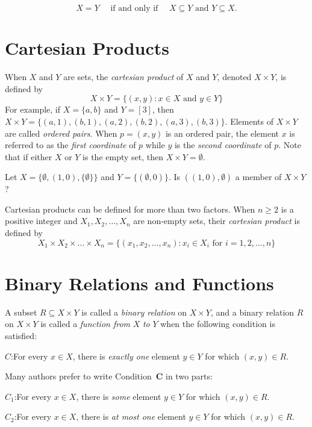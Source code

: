 \[
X = Y \quad\text{ if and only if }\quad X\subseteq Y \text{ and } Y\subseteq X.
\]  

\section{Cartesian Products} 

When $X$ and $Y$ are sets, the \textit{cartesian product}
of $X$ and $Y$, denoted $X\times Y$, is defined by
\[
X\times Y=\{(x,y): x\in X \text{ and } y\in Y\}
\]
For example, if $X=\{a,b\}$ and $Y=[3]$, then
$X\times Y=\{(a,1),(b,1),(a,2),(b,2),(a,3),(b,3)\}$.
Elements of $X\times Y$ are called \textit{ordered pairs}.
When $p=(x,y)$ is an ordered pair, the element $x$ is referred
to as the \textit{first coordinate} of $p$ while $y$ is the
\textit{second coordinate} of $p$.
Note that if either $X$ or $Y$ is the empty set, then
$X\times Y=\emptyset$.

\begin{example}
Let $X=\{\emptyset,(1,0),\{\emptyset\}\}$ and $Y=\{(\emptyset,0)\}$.
Is $((1,0),\emptyset)$ a member of $X\times Y$?
\end{example}

Cartesian products can be defined for more than two factors.
When $n\ge 2$ is a positive integer and $X_1,X_2,\dots,X_n$ are
non-empty sets, their \textit{cartesian product} is defined
by
\[
X_1\times X_2\times\dots\times X_n=\{(x_1,x_2,\dots,x_n): x_i\in X_i
\text{ for } i = 1,2,\dots,n\}
\]


\section{Binary Relations and Functions}

A subset $R\subseteq X\times Y$ is called a \textit{binary
relation} on $X\times Y$, and a binary relation $R$ on $X\times Y$ 
is called a \textit{function from} $X$ \textit{to} $Y$ when the
following condition is satisfied:

\medskip
\noindent
$C$:\quad For every $x\in X$, there is \textit{exactly one}
element $y\in Y$ for which $(x,y)\in R$.

\medskip
Many authors prefer to write Condition~\textbf{C} in two parts:

\medskip
\noindent
$C_1$:\quad For every $x\in X$, there is \textit{some}
element $y\in Y$ for which $(x,y)\in R$.

\medskip
\noindent
$C_2$:\quad For every $x\in X$, there is \textit{at most one}
element $y\in Y$ for which $(x,y)\in R$.

